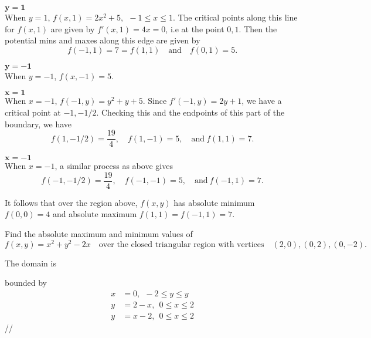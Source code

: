 \documentclass[12pt]{exam}
\begin{document}
\begin{questions}
\begin{solution}
            \noindent \(\bm{y=1}\)\\
            When \(y=1\), \(f(x,1)=2x^2+5,~~-1\le x\le 1\). The critical points along this line for \(f(x,1)\) are given by \(f'(x,1)=4x=0\), i.e at the point \(0,1\).
            Then the potential mins and maxes along this edge are given by 
            \[
                f(-1,1)=7=f(1,1)\quad \text{and}\quad f(0,1)=5.
            \]

            \noindent \(\bm{y=-1}\)\\
            When \(y=-1\), \(f(x,-1)=5\).


            \noindent \(\bm{x=1}\)\\
            When \(x=-1\), \(f(-1,y)=y^2+y+5\).
            Since \(f'(-1,y)=2y+1\), we have a critical point at \(-1,-1/2\). Checking this and the endpoints of this part of the boundary, we have
            \[
                f(1,-1/2)=\frac{19}{4},\quad f(1,-1)=5,\quad \text{and}~ f(1,1)=7.
            \]

            \noindent \(\bm{x=-1}\)\\
            When \(x=-1\), a similar process as above gives 
            \[
                f(-1,-1/2)=\frac{19}{4},\quad f(-1,-1)=5,\quad \text{and}~ f(-1,1)=7.
            \]
            
            It follows that over the region above, \(f(x,y)\) has absolute minimum \(f(0,0)=4\) and absolute maximum \(f(1,1)=f(-1,1)=7\).

            
        \end{solution}
    \else
        \vfill
    \fi

\question Find the absolute maximum and minimum values of 
\[
    f(x,y)=x^2+y^2-2x \quad \text{over the closed triangular region with vertices} \quad (2,0),(0,2),(0,-2).
\]
    \ifprintanswers
        \begin{solution}
            The domain is 
            \begin{center}
            \end{center}
            bounded by 
            \begin{align*}
                x&=0,~~ -2\le y\le y\\
                y&=2-x,~~ 0\le x\le 2\\
                y&=x-2,~~ 0\le x\le 2
            \end{align*}//


\end{solution}
\end{questions}
\end{document}
